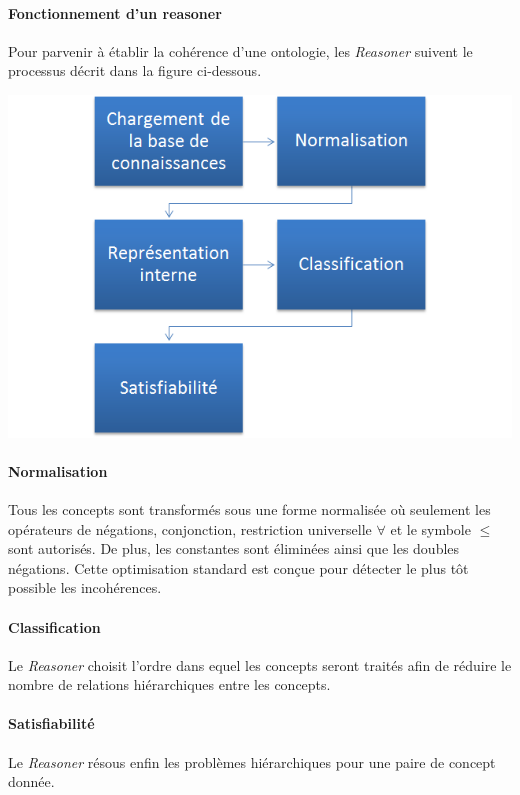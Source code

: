 \documentclass {report}
\begin{document}
\paragraph{Fonctionnement d'un reasoner}
Pour parvenir à établir la cohérence d'une ontologie, les \textit{Reasoner} suivent le processus décrit dans la figure ci-dessous.
\begin{multicols}{2}
\begin{center}
\includegraphics[scale=0.5]{process_reasoner.png}
\end{center}

\paragraph{Normalisation} Tous les concepts sont transformés sous une forme normalisée où seulement les opérateurs de négations, conjonction, restriction universelle $\forall$ et le symbole $\leq$ sont autorisés. De plus, les constantes sont éliminées ainsi que les doubles négations. Cette optimisation standard est conçue pour détecter le plus tôt possible les incohérences.
\paragraph{Classification} Le \textit{Reasoner} choisit l'ordre dans equel les concepts seront traités afin de réduire le nombre de relations hiérarchiques entre les concepts.
\paragraph{Satisfiabilité} Le \textit{Reasoner} résous enfin les problèmes hiérarchiques pour une paire de concept donnée.
\end{multicols}
\end{document}

